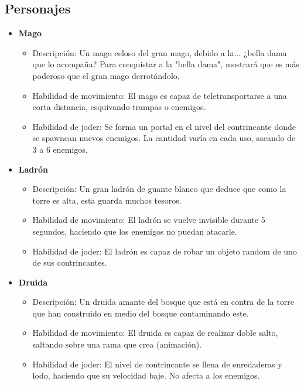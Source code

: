 \subsection{Personajes}
\begin{itemize} %
    \item \textbf{Mago}       %
    \begin{itemize}
        \item Descripción: Un mago celoso del gran mago, debido a la... ¿bella dama que lo acompaña? Para conquistar a la "bella dama", mostrará que es más poderoso que el gran mago derrotándolo.
        \item Habilidad de movimiento: El mago es capaz de teletransportarse a una corta distancia, esquivando trampas o enemigos.
        \item Habilidad de joder: Se forma un portal en el nivel del contrincante donde se spawnean nuevos enemigos. La cantidad varía en cada uso, sacando de 3 a 6 enemigos.
    \end{itemize}
    \item \textbf{Ladrón}      %
    \begin{itemize}
        \item Descripción: Un gran ladrón de guante blanco que deduce que como la torre es alta, esta guarda muchos tesoros.
        \item Habilidad de movimiento: El ladrón se vuelve invisible durante 5 segundos, haciendo que los enemigos no puedan atacarle.
        \item Habilidad de joder: El ladrón es capaz de robar un objeto random de uno de sus contrincantes.
    \end{itemize}
    \item \textbf{Druida}     %
    \begin{itemize}
        \item Descripción: Un druida amante del bosque que está en contra de la torre que han construido en medio del bosque contaminando este.
        \item Habilidad de movimiento: El druida es capaz de realizar doble salto, saltando sobre una rama que crea (animación).
        \item Habilidad de joder: El nivel de contrincante se llena de enredaderas y lodo, haciendo que su velocidad baje. No afecta a los enemigos.

\end{itemize}
\end{itemize}
